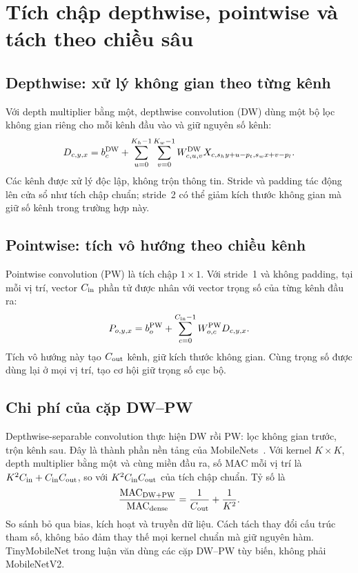 \section{Tích chập depthwise, pointwise và tách theo chiều sâu}
\subsection{Depthwise: xử lý không gian theo từng kênh}
Với depth multiplier bằng một, depthwise convolution (DW) dùng một bộ lọc không gian riêng cho mỗi kênh đầu vào và giữ nguyên số kênh:
\begin{equation}
 D_{c,y,x}=b^{\rm DW}_c+\sum_{u=0}^{K_h-1}\sum_{v=0}^{K_w-1}
 W^{\rm DW}_{c,u,v}X_{c,s_hy+u-p_t,s_wx+v-p_l}.
\end{equation}
Các kênh được xử lý độc lập, không trộn thông tin. Stride và padding tác động lên cửa sổ như tích chập chuẩn; stride~2 có thể giảm kích thước không gian mà giữ số kênh trong trường hợp này.

\subsection{Pointwise: tích vô hướng theo chiều kênh}
Pointwise convolution (PW) là tích chập $1\times1$. Với stride~1 và không padding, tại mỗi vị trí, vector $C_{\rm in}$ phần tử được nhân với vector trọng số của từng kênh đầu ra:
\begin{equation}
 P_{o,y,x}=b^{\rm PW}_o+\sum_{c=0}^{C_{\rm in}-1}W^{\rm PW}_{o,c}D_{c,y,x}.
\end{equation}
Tích vô hướng này tạo $C_{\rm out}$ kênh, giữ kích thước không gian. Cùng trọng số được dùng lại ở mọi vị trí, tạo cơ hội giữ trọng số cục bộ.

\subsection{Chi phí của cặp DW--PW}
Depthwise-separable convolution thực hiện DW rồi PW: lọc không gian trước, trộn kênh sau. Đây là thành phần nền tảng của MobileNets~\cite{howard2017mobilenets}. Với kernel $K\times K$, depth multiplier bằng một và cùng miền đầu ra, số MAC mỗi vị trí là $K^2C_{\rm in}+C_{\rm in}C_{\rm out}$, so với $K^2C_{\rm in}C_{\rm out}$ của tích chập chuẩn. Tỷ số là
\begin{equation}
 \frac{\mathrm{MAC}_{\rm DW+PW}}{\mathrm{MAC}_{\rm dense}}=\frac{1}{C_{\rm out}}+\frac{1}{K^2}.
\end{equation}
So sánh bỏ qua bias, kích hoạt và truyền dữ liệu. Cách tách thay đổi cấu trúc tham số, không bảo đảm thay thế mọi kernel chuẩn mà giữ nguyên hàm. TinyMobileNet trong luận văn dùng các cặp DW--PW tùy biến, không phải MobileNetV2.

